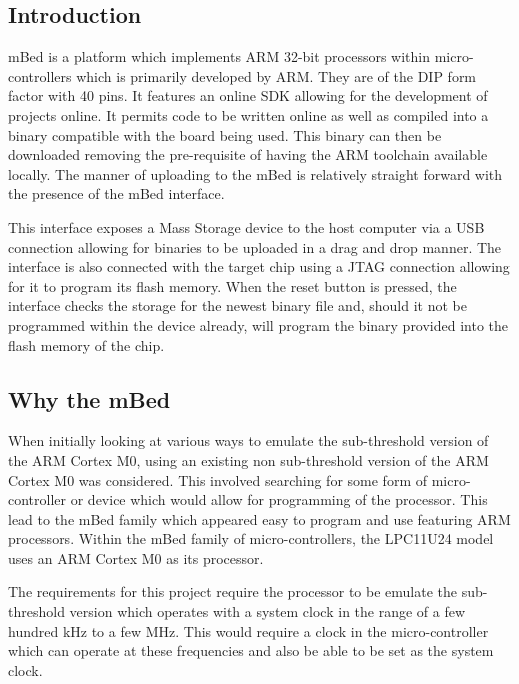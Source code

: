 

\subsection{Introduction}

mBed is a platform which implements ARM 32-bit processors within micro-controllers which is primarily developed by ARM. They are of the DIP form factor with 40 pins. It features an online SDK allowing for the development of projects online. It permits code to be written online as well as compiled into a binary compatible with the board being used. This binary can then be downloaded removing the pre-requisite of having the ARM toolchain available locally. The manner of uploading to the mBed is relatively straight forward with the presence of the mBed interface. \cite{mbed_website}

This interface exposes a Mass Storage device to the host computer via a USB connection allowing for binaries to be uploaded in a drag and drop manner. The interface is also connected with the target chip using a JTAG connection allowing for it to program its flash memory. When the reset button is pressed, the interface checks the storage for the newest binary file and, should it not be programmed within the device already, will program the binary provided into the flash memory of the chip. \cite{mbed_website}

\subsection{Why the mBed}

When initially looking at various ways to emulate the sub-threshold version of the ARM Cortex M0, using an existing non sub-threshold version of the ARM Cortex M0 was considered. This involved searching for some form of micro-controller or device which would allow for programming of the processor. This lead to the mBed family which appeared easy to program and use featuring ARM processors. Within the mBed family of micro-controllers, the LPC11U24 model uses an ARM Cortex M0 as its processor.

The requirements for this project require the processor to be emulate the sub-threshold version which operates with a system clock in the range of a few hundred kHz to a few MHz. This would require a clock in the micro-controller which can operate at these frequencies and also be able to be set as the system clock.

